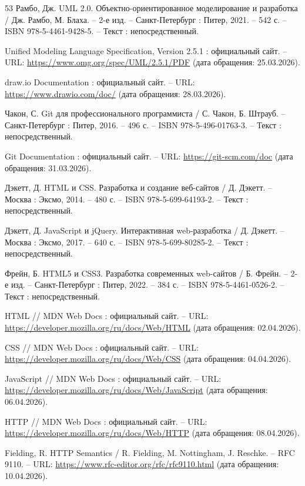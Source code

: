 \begin{thebibliography}{53}
	Рамбо, Дж. UML 2.0. Объектно-ориентированное моделирование и разработка / Дж. Рамбо, М. Блаха. – 2-е изд. – Санкт-Петербург : Питер, 2021. – 542 с. – ISBN 978-5-4461-9428-5. – Текст : непосредственный.
	
	Unified Modeling Language Specification, Version 2.5.1 : официальный сайт. – URL: \url{https://www.omg.org/spec/UML/2.5.1/PDF} (дата обращения: 25.03.2026).
	
	draw.io Documentation : официальный сайт. – URL: \url{https://www.drawio.com/doc/} (дата обращения: 28.03.2026).
	
	Чакон, С. Git для профессионального программиста / С. Чакон, Б. Штрауб. – Санкт-Петербург : Питер, 2016. – 496 с. – ISBN 978-5-496-01763-3. – Текст : непосредственный.
	
	Git Documentation : официальный сайт. – URL: \url{https://git-scm.com/doc} (дата обращения: 31.03.2026).
	
	Дэкетт, Д. HTML и CSS. Разработка и создание веб-сайтов / Д. Дэкетт. – Москва : Эксмо, 2014. – 480 с. – ISBN 978-5-699-64193-2. – Текст : непосредственный.
	
	Дэкетт, Д. JavaScript и jQuery. Интерактивная web-разработка / Д. Дэкетт. – Москва : Эксмо, 2017. – 640 с. – ISBN 978-5-699-80285-2. – Текст : непосредственный.
	
	Фрейн, Б. HTML5 и CSS3. Разработка современных web-сайтов / Б. Фрейн. – 2-е изд. – Санкт-Петербург : Питер, 2022. – 384 с. – ISBN 978-5-4461-0526-2. – Текст : непосредственный.
	
	HTML // MDN Web Docs : официальный сайт. – URL: \url{https://developer.mozilla.org/ru/docs/Web/HTML} (дата обращения: 02.04.2026).
	
	CSS // MDN Web Docs : официальный сайт. – URL: \url{https://developer.mozilla.org/ru/docs/Web/CSS} (дата обращения: 04.04.2026).
	
	JavaScript // MDN Web Docs : официальный сайт. – URL: \url{https://developer.mozilla.org/ru/docs/Web/JavaScript} (дата обращения: 06.04.2026).
	
	HTTP // MDN Web Docs : официальный сайт. – URL: \url{https://developer.mozilla.org/ru/docs/Web/HTTP} (дата обращения: 08.04.2026).
	
	Fielding, R. HTTP Semantics / R. Fielding, M. Nottingham, J. Reschke. – RFC 9110. – URL: \url{https://www.rfc-editor.org/rfc/rfc9110.html} (дата обращения: 10.04.2026).
	

\end{thebibliography}
